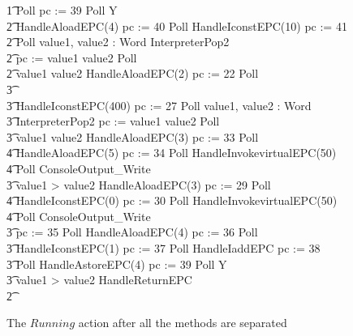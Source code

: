 \begin{figure}[p!]
\begin{circus}
    \t1 Poll \circseq pc := 39 \circseq Poll \circseq \circmu Y \circspot \\
    \t2 HandleAloadEPC(4) \circseq pc := 40 \circseq Poll \circseq HandleIconstEPC(10) \circseq pc := 41 \circseq \\
    \t2 Poll \circseq \circvar value1, value2 : Word \circspot InterpreterPop2 \circseq \\
    \t2 pc := \IF value1 \leq value2   \circseq Poll \circseq \\
    \t2 \circif value1 \leq value2 \circthen HandleAloadEPC(2) \circseq pc := 22 \circseq Poll \circseq \\
    \t3 {} \cdots {} \\
    \t3 HandleIconstEPC(400) \circseq pc := 27 \circseq Poll \circseq \circvar value1, value2 : Word \circspot \\
    \t3 InterpreterPop2 \circseq pc := \IF value1 \leq value2   \circseq Poll \circseq \\
    \t3 \circif value1 \leq value2 \circthen HandleAloadEPC(3) \circseq pc := 33 \circseq Poll \circseq \\
    \t4 HandleAloadEPC(5) \circseq pc := 34 \circseq Poll \circseq HandleInvokevirtualEPC(50) \circseq \\
    \t4 Poll \circseq ConsoleOutput\_Write \\
    \t3 {} \circelse value1 > value2 \circthen HandleAloadEPC(3) \circseq pc := 29 \circseq Poll \circseq \\
    \t4  HandleIconstEPC(0) \circseq pc := 30 \circseq  Poll \circseq HandleInvokevirtualEPC(50) \circseq \\
    \t4 Poll \circseq ConsoleOutput\_Write \\
    \t3 \circfi \circseq pc := 35 \circseq Poll \circseq  HandleAloadEPC(4) \circseq pc := 36 \circseq Poll \circseq \\
    \t3 HandleIconstEPC(1) \circseq pc := 37 \circseq Poll \circseq HandleIaddEPC \circseq pc := 38 \circseq \\
    \t3 Poll \circseq HandleAstoreEPC(4) \circseq pc := 39 \circseq Poll \circseq Y \\
    \t3 {} \circelse value1 > value2 \circthen  HandleReturnEPC \\
    \t2 \circfi \\
  \end{circus}
  \caption{The $Running$ action after all the methods are separated}
  \label{final-method-separation-example-figure}
\end{figure}

